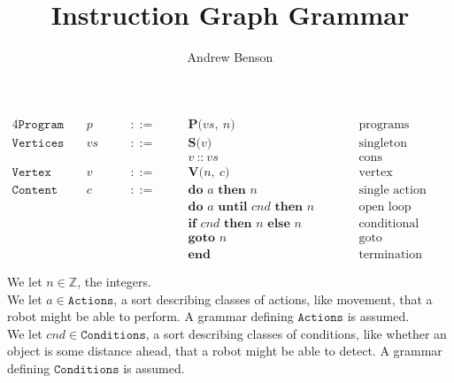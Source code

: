 \documentclass[12pt]{article}
\title{Instruction Graph Grammar}
\author{Andrew Benson}
\date{}
\newcommand{\sort}[1]{\mathtt{#1}}
\newcommand{\syn}[1]{\textbf{#1}}
\newcommand{\nterm}[1]{\mathit{#1}}
\newcommand{\prog}[2]{\syn{P(}#1,\ #2\syn{)}}
\newcommand{\sing}[1]{\syn{S(}#1\syn{)}}
\newcommand{\cons}[2]{#1\ \syn{::}\ #2}
\newcommand{\ver}[2]{\syn{V(}#1,\ #2\syn{)}}
\newcommand{\doonce}[2]{\syn{do }#1\syn{ then }#2}
\newcommand{\dountil}[3]{\syn{do }#1\syn{ until }#2\syn{ then }#3}
\newcommand{\ifelse}[3]{\syn{if }#1\syn{ then }#2\syn{ else }#3}
\newcommand{\goto}[1]{\syn{goto }#1}
\newcommand{\progend}[0]{\syn{end}}
\begin{document}
\maketitle

\begin{alignat*}{4}
  \sort{Program}\quad
    &\nterm{p}\quad & &::=\quad &
      &\prog{\nterm{vs}}{\nterm{n}}\qquad & &\text{programs}\\
  \sort{Vertices}\quad
    &\nterm{vs}\quad & &::=\quad &
      &\sing{\nterm{v}}\qquad & &\text{singleton}\\
  &&&&&\cons{\nterm{v}}{\nterm{vs}}\qquad & &\text{cons}\\
  \sort{Vertex}\quad
    &\nterm{v}\quad & &::=\quad &
      &\ver{\nterm{n}}{\nterm{c}}\qquad & &\text{vertex}\\
  \sort{Content}\quad
    &\nterm{c}\quad & &::=\quad &
      &\doonce{\nterm{a}}{\nterm{n}}\qquad & &\text{single action}\\
  &&&&&\dountil{\nterm{a}}{\nterm{cnd}}{\nterm{n}}\qquad & &\text{open loop action}\\
  &&&&&\ifelse{\nterm{cnd}}{\nterm{n}}{\nterm{n}}\qquad & & \text{conditional}\\
  &&&&&\goto{\nterm{n}}\qquad & &\text{goto}\\
  &&&&&\progend\qquad & &\text{termination}
\end{alignat*}

We let $\nterm{n} \in \mathbb{Z}$, the integers.\\

We let $\nterm{a} \in \sort{Actions}$, a sort describing classes of actions,
like movement, that a robot might be able to perform. A grammar defining
$\sort{Actions}$ is assumed.\\

We let $\nterm{cnd} \in \sort{Conditions}$, a sort describing classes of
conditions, like whether an object is some distance ahead, that a robot might be
able to detect. A grammar defining $\sort{Conditions}$ is assumed.\\
\end{document}
